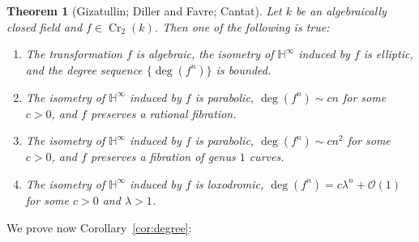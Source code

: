 \documentclass[11pt]{article}
\numberwithin{equation}{section}
\newcommand{\h}{\operatorname{\mathbb{H}^{\infty}}}
\newcommand{\kk}{k}
\newcommand{\Cr}{\operatorname{Cr}}
\theoremstyle{plain}
\newtheorem{theorem}{Theorem}[section]
\theoremstyle{definition}
\begin{document}
\begin{theorem}[Gizatullin; Diller and Favre; Cantat]\label{thm:hyperboloid}
Let $\kk$ be an algebraically closed field and $f\in\Cr_2(k)$. Then one of the following is true:
\begin{enumerate}
\item The transformation $f$ is algebraic, the isometry of $\h$ induced by $f$ is elliptic, and the degree sequence $\{\deg(f^n)\}$ is bounded.
\item[(2a)] The isometry of $\h$ induced by $f$ is parabolic, $\deg(f^n)\sim cn$ for some $c>0$, and $f$ preserves a rational fibration.
\item[(2b)] The isometry of $\h$ induced by $f$ is parabolic, $\deg(f^n)\sim cn^2$ for some $c>0$, and $f$ preserves a fibration of genus $1$ curves.
\item[(3)] The isometry of $\h$ induced by $f$ is loxodromic, $\deg(f^n)=c\lambda^n +\mathcal{O}(1)$ for some $c>0$ and $\lambda>1$.
\end{enumerate}
\end{theorem}

We prove now Corollary~\ref{cor:degree}:
\end{document}
